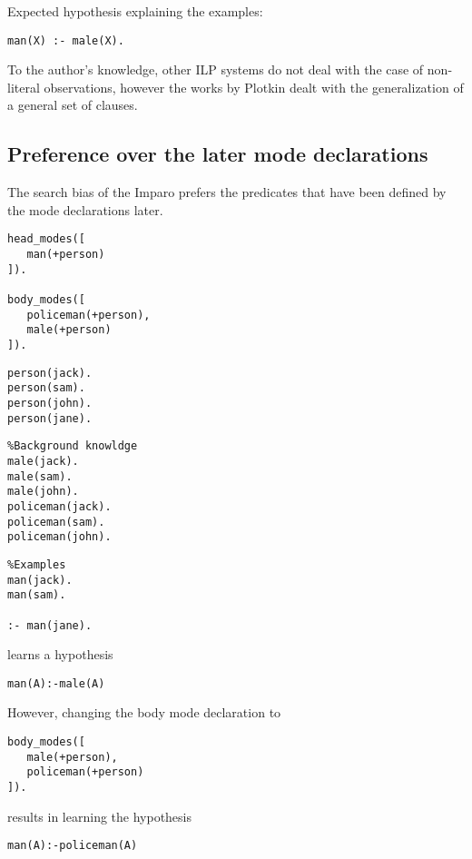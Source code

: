 Expected hypothesis explaining the examples:

\begin{lstlisting}
man(X) :- male(X).
\end{lstlisting}

To the author's knowledge, other ILP systems do not deal with the case of non-literal observations, however the works by Plotkin dealt with the generalization of a general set of clauses.

\subsection{Preference over the later mode declarations}
The search bias of the Imparo prefers the predicates that have been defined by the mode declarations later.

\begin{minipage}[t]{.25\textwidth}
\begin{lstlisting}
head_modes([
   man(+person)
]).

body_modes([
   policeman(+person),
   male(+person)
]).
\end{lstlisting}
\end{minipage}
\begin{minipage}[t]{.20\textwidth}
\begin{lstlisting}
person(jack).
person(sam).
person(john).
person(jane).
\end{lstlisting}
\end{minipage}
\begin{minipage}[t]{.30\textwidth}
\begin{lstlisting}
%Background knowldge
male(jack).
male(sam).
male(john).
policeman(jack).
policeman(sam).
policeman(john).
\end{lstlisting}
\end{minipage}
\begin{minipage}[t]{.25\textwidth}
\begin{lstlisting}
%Examples
man(jack).
man(sam).

:- man(jane).
\end{lstlisting}
\end{minipage}


learns a hypothesis
\begin{lstlisting}
man(A):-male(A)
\end{lstlisting}
However, changing the body mode declaration to
\begin{lstlisting}
body_modes([   
   male(+person),
   policeman(+person)
]).
\end{lstlisting}
results in learning the hypothesis
\begin{lstlisting}
man(A):-policeman(A)
\end{lstlisting}

